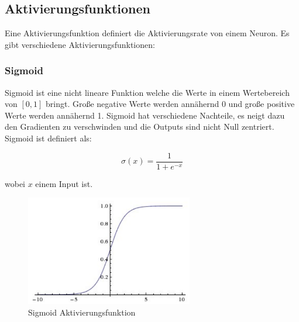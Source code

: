 \subsection{Aktivierungsfunktionen}\label{subsection:aktivierungsfunktionen}
Eine Aktivierungsfunktion definiert die Aktivierungsrate von einem Neuron. Es gibt verschiedene Aktivierungsfunktionen:

\subsubsection{Sigmoid}
Sigmoid ist eine nicht lineare Funktion welche die Werte in einem Wertebereich von $ [0, 1] $ bringt.
Große negative Werte werden annähernd 0 und große positive Werte werden annähernd 1. Sigmoid hat verschiedene Nachteile, es neigt dazu den Gradienten zu verschwinden
und die Outputs sind nicht Null zentriert. Sigmoid ist definiert als:

\begin{equation}
  \sigma(x) = \frac{1}{1 + e^{-x}}
\end{equation}

wobei $x$ einem Input ist.

\begin{figure}[H]
  \centering
  \includegraphics[width=0.65\textwidth]{resources/nn/sigmoid.png}
  \caption{
    Sigmoid Aktivierungsfunktion 
    \cite{neuron-model}
  }
  \label{image:sigmoid}
\end{figure}


